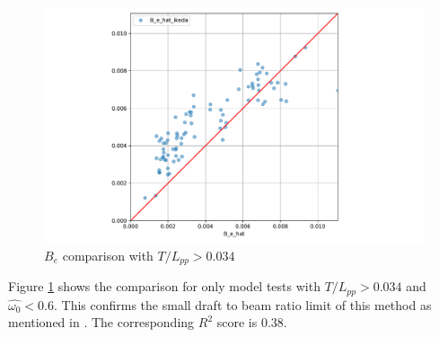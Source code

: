 \begin{figure}[H]
    \centering
    \includegraphics[width=\columnwidth]{figures/B_e_hat_good.pdf}
    \caption{$\hat{B_e}$ comparison with $T/L_{pp}>0.034$}
    \label{fig:B_e_hat_good}
\end{figure}

Figure \ref{fig:B_e_hat_good} shows the comparison for only model tests with $T/L_{pp}>0.034$ and $\hat{\omega_0} < 0.6$.
This confirms the small draft to beam ratio limit of this method as mentioned in \cite{kawahara_simple_2011}. The corresponding $R^2$ score is 0.38.


